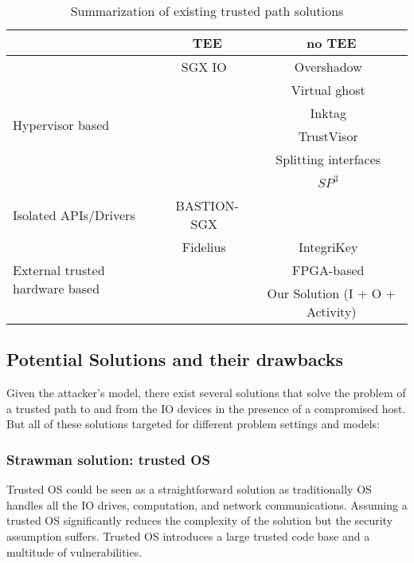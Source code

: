 \iffalse
\myparagraph{Advantages}

\begin{enumerate}
  \item The \device does not need to know the formatting/template of the page. As the \device only looks to the current mouse position, the structure of the page is somewhat irrelevant (?).
\end{enumerate}
\fi


\begin{table*}[t]
\normalsize
\centering
  \begin{tabular}{ | l | c | c |}
    \hline
     & TEE & no TEE \\ \hline
    \multirow{6}{*}{Hypervisor based} & SGX IO~\cite{weiser2017sgxio} & Overshadow~\cite{Overshadow} \\ 
    & & Virtual ghost~\cite{criswell2014virtual}\\ 
    & & Inktag~\cite{hofmann2013inktag}\\ 
    & & TrustVisor~\cite{mccune2010trustvisor} \\ 
    & & Splitting interfaces~\cite{ta2006splitting}\\ 
    & & $SP^3$~\cite{yang2008using}\\ \hline
    Isolated APIs/Drivers & BASTION-SGX~\cite{BASTION-SGX} & \\ \hline
    \multirow{3}{*}{External trusted hardware based} & Fidelius~\cite{Fidelius} & IntegriKey~\cite{IntegriKey} \\
    &  & FPGA-based~\cite{brandon2017trusted} \\
    &  & \textcolor{OliveGreen}{Our Solution (I + O + Activity)} \\
    \hline
  \end{tabular}
  \caption{Summarization of existing trusted path solutions}
\end{table*}


\subsection{Potential Solutions and their drawbacks}

Given the attacker's model, there exist several solutions that solve the problem of a trusted path to and from the IO devices in the presence of a compromised host. But all of these solutions targeted for different problem settings and models:

\subsubsection{Strawman solution: trusted OS} Trusted OS could be seen as a straightforward solution as traditionally OS handles all the IO drives, computation, and network communications. Assuming a trusted OS significantly reduces the complexity of the solution but the security assumption suffers. Trusted OS introduces a large trusted code base and a multitude of vulnerabilities. 

